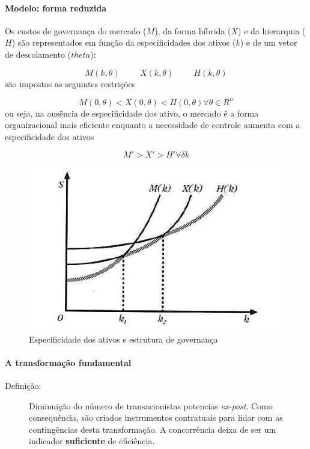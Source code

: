\paragraph*{Modelo: forma reduzida}

Os custos de governança do mercado ($M$), da forma híbrida ($X$) e da hierarquia ($H$) são representados em função da especificidades dos ativos ($k$) e de um vetor de descolamento ($theta$):

$$
M(k, \theta) \hspace{1cm} X(k, \theta) \hspace{1cm} H(k, \theta)
$$
são impostas as seguintes restrições

$$
M(0, \theta) < X(0, \theta) < H(0, \theta) \forall \theta \in R^n
$$
ou seja, na ausência de especificidade dos ativo, o mercado é a forma organizacional mais eficiente enquanto a necessidade de controle aumenta com a especificidade dos ativos

$$
M' > X' > H' \forall \delta k
$$

\begin{figure}[h]
	\centering
	\caption{Especificidade dos ativos e estrutura de governança}
	\label{fig:screenshot002}
	\includegraphics[width=0.7\linewidth]{screenshot002}
\end{figure}


\paragraph*{A transformação fundamental}

\begin{description}
	\item[Definição:] Diminuição do número de transacionistas potencias \textit{ex-post}. Como consequência, são criados instrumentos contratuais para lidar com as contingências desta transformação. A concorrência deixa de ser um indicador \textbf{suficiente} de eficiência.
\end{description}

